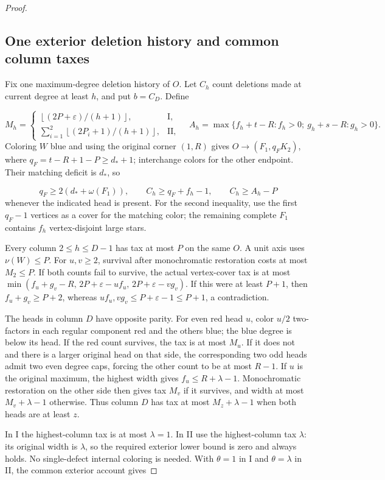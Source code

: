 \documentclass[11pt,a4paper]{article}
\newcommand{\floor}[1]{\left\lfloor#1\right\rfloor}
\theoremstyle{definition}
\begin{document}
\begin{proof}
\subsection*{One exterior deletion history and common column taxes}
Fix one maximum-degree deletion history of $O$.
Let $C_h$ count deletions made at current degree at least $h$, and put $b=C_D$.
Define

\[
M_h=\begin{cases}\floor{(2P+\varepsilon)/(h+1)},&\mathrm I,\\
\sum_{i=1}^2\floor{(2P_i+1)/(h+1)},&\mathrm {II},\end{cases}
\quad
A_h=\max\{f_h+t-R:f_h>0;\ g_h+s-R:g_h>0\}.
\]
Coloring $W$ blue and using the original corner $(1,R)$ gives
$O\to(F_1,q_FK_2)$, where $q_F=t-R+1-P\ge d_*+1$;
interchange colors for the other endpoint. Their matching deficit is $d_*$, so

\begin{equation}\label{eq:regular-inventory}
q_F\ge2(d_*+\omega(F_1)),\qquad
C_h\ge q_F+f_h-1,\qquad C_h\ge A_h-P
\end{equation}
whenever the indicated head is present.
For the second inequality, use the first $q_F-1$ vertices as a cover
for the matching color; the remaining complete $F_1$ contains $f_h$
vertex-disjoint large stars.

Every column $2\le h\le D-1$ has tax at most $P$ on the same $O$.
A unit axis uses $\nu(W)\le P$.
For $u,v\ge2$, survival after monochromatic restoration costs at most $M_2\le P$.
If both counts fail to survive, the actual vertex-cover tax is at most
$\min(f_u+g_v-R,\,2P+\varepsilon-uf_u,\,2P+\varepsilon-vg_v)$.
If this were at least $P+1$, then $f_u+g_v\ge P+2$, whereas
$uf_u,vg_v\le P+\varepsilon-1\le P+1$, a contradiction.

The heads in column $D$ have opposite parity.
For even red head $u$, color $u/2$ two-factors in each regular component red
and the others blue; the blue degree is below its head.
If the red count survives, the tax is at most $M_u$.
If it does not and there is a larger original head on that side,
the corresponding two odd heads admit two even degree caps,
forcing the other count to be at most $R-1$.
If $u$ is the original maximum, the highest width gives $f_u\le R+\lambda-1$.
Monochromatic restoration on the other side then gives tax $M_v$
if it survives, and width at most $M_v+\lambda-1$ otherwise.
Thus column $D$ has tax at most $M_z+\lambda-1$ when both heads are at least $z$.

In I the highest-column tax is at most $\lambda=1$.
In II use the highest-column tax $\lambda$: its original width is
$\lambda$, so the required exterior lower bound is zero and always holds.
No single-defect internal coloring is needed.
With $\theta=1$ in I and $\theta=\lambda$ in II, the common exterior account gives


\end{proof}
\end{document}
